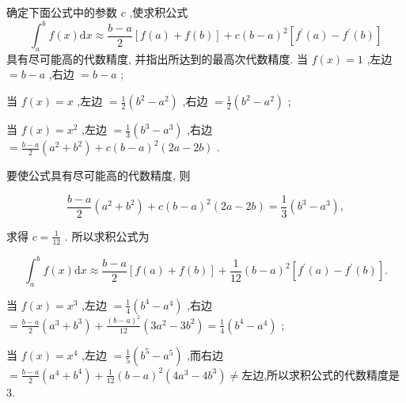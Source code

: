 \begin{tcolorbox}[enhanced,colback=10,colframe=9,breakable,coltitle=green!25!black,title=2024]
确定下面公式中的参数 $c$ ,使求积公式
$${\int}_{a}^{b}f(x)\mathrm{d}x {\approx} \frac{b {-} a}{2}\left\lbrack f(a) + f(b) \right\rbrack + c{(b {-} a)}^{2}\left\lbrack f^{{\prime}}(a) {-} f^{{\prime}}(b) \right\rbrack$$
具有尽可能高的代数精度, 并指出所达到的最高次代数精度.
\tcblower
当 $f(x) = 1$ ,左边 $ = b {-} a$ ,右边 $ = b {-} a$ ;

当 $f(x) = x$ ,左边 $ = \frac{1}{2}\left( b^{2} {-} a^{2} \right)$ ,右边 $ = \frac{1}{2}\left( b^{2} {-} a^{2} \right)$ ;

当 $f(x) = x^{2}$ ,左边 $ = \frac{1}{3}\left( b^{3} {-} a^{3} \right)$ ,右边 $ = \frac{b {-} a}{2}\left( a^{2} + b^{2} \right) + c{(b {-} a)}^{2}(2a {-} 2b)$ .

要使公式具有尽可能高的代数精度, 则

$$\frac{b {-} a}{2}\left( a^{2} + b^{2} \right) + c{(b {-} a)}^{2}(2a {-} 2b) = \frac{1}{3}\left( b^{3} {-} a^{3} \right),$$

求得 $c = \frac{1}{12}$ . 所以求积公式为

$${\int}_{a}^{b}f(x)\mathrm{d}x {\approx} \frac{b {-} a}{2}\left\lbrack f(a) + f(b) \right\rbrack + \frac{1}{12}{(b {-} a)}^{2}\left\lbrack f^{{\prime}}(a) {-} f^{{\prime}}(b) \right\rbrack.$$

当 $f(x) = x^{3}$ ,左边 $ = \frac{1}{4}\left( b^{4} {-} a^{4} \right)$ ,右边 $ = \frac{b {-} a}{2}\left( a^{3} + b^{3} \right) + \frac{{(b {-} a)}^{2}}{12}\left( 3a^{2} {-} 3b^{2} \right) = \frac{1}{4}\left( b^{4} {-} a^{4} \right)$ ;

当 $f(x) = x^{4}$ ,左边 $ = \frac{1}{5}\left( b^{5} {-} a^{5} \right)$ ,而右边$= \frac{b {-} a}{2}\left( a^{4} + b^{4} \right) + \frac{1}{12}{(b {-} a)}^{2}\left( 4a^{3} {-} 4b^{3} \right) {\neq}$左边,所以求积公式的代数精度是 3.


\end{tcolorbox}

